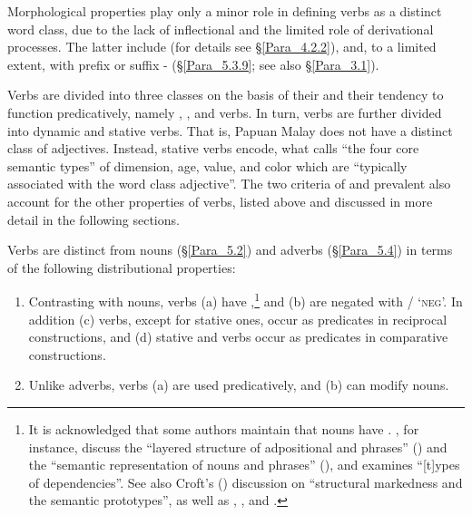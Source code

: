 Morphological properties play only a minor role in defining verbs as a distinct word class, due to the lack of inflectional  and the limited role of derivational processes. The latter include  (for details see §\ref{Para_4.2.2}), and, to a limited extent,  with prefix  or suffix - (§\ref{Para_5.3.9}; see also §\ref{Para_3.1}).



Verbs are divided into three classes on the basis of their  and their tendency to function predicatively, namely , , and  verbs. In turn,  verbs are further divided into dynamic and stative verbs. That is, Papuan Malay does not have a distinct class of adjectives. Instead,  stative verbs encode, what \citet[4]{Dixon.2004b} calls “the four core semantic types” of dimension, age, value, and color which are “typically associated with the word class adjective”. The two criteria of  and prevalent  also account for the other properties of verbs, listed above and discussed in more detail in the following sections.



Verbs are distinct from nouns (§\ref{Para_5.2}) and adverbs (§\ref{Para_5.4}) in terms of the following distributional properties:

\begin{enumerate}
\item 
Contrasting with nouns, verbs (a) have ,\footnote{It is acknowledged that some authors maintain that nouns have . \citet{vanValin.1997}, for instance, discuss the “layered structure of adpositional and  phrases” (\citeyear*[52–67]{vanValin.1997}) and the “semantic representation of nouns and  phrases” (\citeyear[184–195]{vanValin.1997}), and \citet[89–92]{vanValin.2001} examines “[t]ypes of dependencies”. See also Croft’s (\citeyear*[62–79]{Croft.1991}) discussion on “structural markedness and the semantic prototypes”, as well as \citet{Allerton.2006}, \citet{Sommerfeldt.1983}, and \cite{vanDurme.1997}.} and (b) are negated with / ‘\textsc{neg}’. In addition (c) verbs, except for  stative ones, occur as predicates in reciprocal constructions, and (d)  stative and  verbs occur as predicates in comparative constructions.
\item 
Unlike adverbs, verbs (a) are used predicatively, and (b) can modify nouns.

\end{enumerate}

